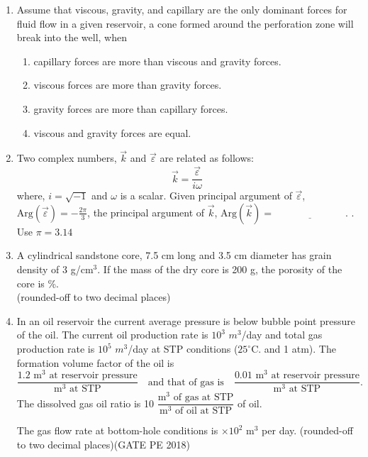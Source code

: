 \documentclass[12pt,a4paper]{article}
\begin{document}
\begin{enumerate}
\item Assume that viscous, gravity, and capillary are the only dominant forces for fluid flow in a
given reservoir, a cone formed around the perforation zone will break into the well, when\hfill{}
\begin{enumerate}
\item capillary forces are more than viscous and gravity forces.
\item viscous forces are more than gravity forces.
\item gravity forces are more than capillary forces.
\item viscous and gravity forces are equal.
\end{enumerate}

\item Two complex numbers, $\vec{k}$ and $\vec{\varepsilon}$ are related as follows:\hfill{}
\[
\vec{k} = \frac{\vec{\varepsilon}}{i\omega}
\]
where, $i = \sqrt{-1}$ and $\omega$ is a scalar. Given principal argument of $\vec{\varepsilon}$, $\text{Arg}(\vec{\varepsilon}) = -\frac{2\pi}{3}$, the principal argument of $\vec{k}$, $\text{Arg}(\vec{k}) = \underline{\hspace{3cm}}$. . \\
Use $\pi = 3.14$



\item A cylindrical sandstone core, 7.5 cm long and 3.5 cm diameter has grain density of 3 g/cm$^3$. If the mass of the dry core is 200 g, the porosity of the core is \underline{\hspace{3cm}} \%.\\
(rounded-off to two decimal places)\hfill{}

\item In an oil reservoir the current average pressure is below bubble point pressure of the oil. The current oil production rate is $10^3$ $m^3$/day and total gas production rate is $10^5$ $m^3$/day at STP conditions ($25^\circ\text{C}$. and 1 atm). The formation volume factor of the oil is
\[
\frac{1.2 \text{ m}^3 \text{ at reservoir pressure}}{\text{m}^3 \text{ at STP}} \quad \text{and that of gas is} \quad \frac{0.01 \text{ m}^3 \text{ at reservoir pressure}}{\text{m}^3 \text{ at STP}}.
\]
The dissolved gas oil ratio is 10 $\dfrac{\text{m}^3 \text{ of gas at STP}}{\text{m}^3 \text{ of oil at STP}}$ of oil.

\vspace{0.2cm}
The gas flow rate at bottom-hole conditions is \underline{\hspace{1.5cm}} $\times 10^2$ m$^3$ per day. (rounded-off to two decimal places)\hfill(GATE PE 2018)


\end{enumerate}
\end{document}
